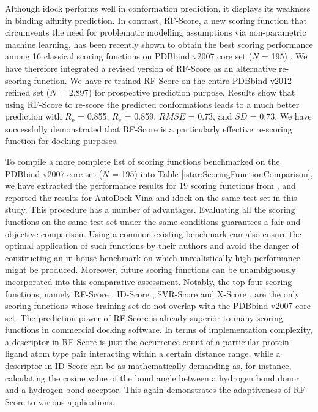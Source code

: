 Although idock performs well in conformation prediction, it displays its weakness in binding affinity prediction. In contrast, RF-Score, a new scoring function that circumvents the need for problematic modelling assumptions via non-parametric machine learning, has been recently shown to obtain the best scoring performance among 16 classical scoring functions on PDBbind v2007 core set ($N$ = 195) \citep{564}. We have therefore integrated a revised version of RF-Score as an alternative re-scoring function. We have re-trained RF-Score on the entire PDBbind v2012 refined set ($N$ = 2,897) for prospective prediction purpose. Results show that using RF-Score to re-score the predicted conformations leads to a much better prediction with $R_p$ = 0.855, $R_s$ = 0.859, $RMSE$ = 0.73, and $SD$ = 0.73. We have successfully demonstrated that RF-Score is a particularly effective re-scoring function for docking purposes.

To compile a more complete list of scoring functions benchmarked on the PDBbind v2007 core set ($N$ = 195) into Table \ref{istar:ScoringFunctionComparison}, we have extracted the performance results for 19 scoring functions from \citep{1313,564,1305,1295}, and reported the results for AutoDock Vina and idock on the same test set in this study. This procedure has a number of advantages. Evaluating all the scoring functions on the same test set under the same conditions guarantees a fair and objective comparison. Using a common existing benchmark can also ensure the optimal application of such functions by their authors and avoid the danger of constructing an in-house benchmark on which unrealistically high performance might be produced. Moreover, future scoring functions can be unambiguously incorporated into this comparative assessment. Notably, the top four scoring functions, namely RF-Score \citep{564}, ID-Score \citep{1305}, SVR-Score \citep{1295} and X-Score \citep{573}, are the only scoring functions whose training set do not overlap with the PDBbind v2007 core set. The prediction power of RF-Score is already superior to many scoring functions in commercial docking software. In terms of implementation complexity, a descriptor in RF-Score is just the occurrence count of a particular protein-ligand atom type pair interacting within a certain distance range, while a descriptor in ID-Score can be as mathematically demanding as, for instance, calculating the cosine value of the bond angle between a hydrogen bond donor and a hydrogen bond acceptor. This again demonstrates the adaptiveness of RF-Score to various applications.

